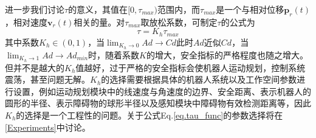 \documentclass[preprint,5p,times,twocolumn]{elsarticle}
\begin{document}

进一步我们讨论$\tau$的意义，其值在$[0,\tau_{max})$范围内，而$\tau_{max}$是一个与相对位移$\boldsymbol{p}_{r}(t)$，相对速度$\boldsymbol{v}_{r}(t)$相关的量。对$\tau_{max}$取放松系数，可制定$\tau$的公式为
\begin{equation}
\label{eq.tau_func}
\tau = K_h \tau_{max}
\end{equation}
其中系数$K_h \in (0,1)$，当$\lim_{K_h \to 0} Ad \to Cd$此时$Ad$近似$Cd$，当$\lim_{K_h \to 1} Ad \to Ad_{min}$时，随着系数$K$的增大，安全指标的严格程度也随之增大。但并不是越大的$K_h$值越好，过于严格的安全指标会使机器人运动规划，控制系统震荡，甚至问题无解。$K_h$的选择需要根据具体的机器人系统以及工作空间参数进行设置，例如运动规划模块中的线速度与角速度的边界、安全距离、表示机器人的圆形的半径、表示障碍物的球形半径以及感知模块中障碍物有效检测距离等，因此$K_h$的选择是一个工程性的问题。关于公式Eq.\ref{eq.tau_func}的参数选择将在\ref{Experiments}中讨论。
\end{document}
